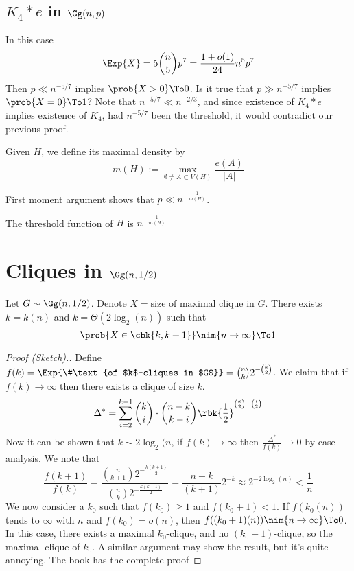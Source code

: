 \documentclass[a4paper, 11pt, oneside]{book}
\begin{document}
\subsection{$K_4*e$ in $\Gg(n,p)$}
In this case
\[
\Exp{X} = 5{n\choose 5}p^7 = \frac{1+o(1)}{24} n^5p^7
\]
Then $p\ll n^{-5/7}$ implies $\prob{X > 0}\To 0$. Is it true that $p\gg n^{-5/7}$ implies $\prob{X = 0}\To 1$? Note that $n^{-5/7} \ll n^{-2/3}$, and since existence of $K_4*e$ implies existence of $K_4$, had $n^{-5/7}$ been the threshold, it would contradict our previous proof.
\begin{yellowBox}
\begin{defn}
	 Given $H$, we define its maximal density by
	\[
	m(H) := \underset{\emptyset\neq A\subset V(H)}{\max} \frac{e(A)}{|A|}
	\]
\end{defn}	
\begin{remark}
	First moment argument shows that $p\ll n^{-\frac{1}{m(H)}}$.
\end{remark}
\end{yellowBox}
\begin{thm}
	\label{thm: Threshold characterization} The threshold function of $H$ is $n^{-\frac{1}{m(H)}}$
\end{thm}
\section{Cliques in $\Gg(n,1/2)$}
\begin{thm}
	Let $G\sim \Gg(n,1/2)$. Denote $X =\text{size of maximal clique in $G$}$.  There exists $k = k(n)$ and $k = \Theta(2\log_2(n))$ such that 
	\[
	\prob{X\in \cbk{k,k+1}} \nim{n\to \infty}\To 1
	\]
\end{thm}
\begin{proof}
	[Proof (Sketch).] Define 
	$f(k) = \Exp{\#\text{of $k$-cliques in $G$}} = {n\choose k}2^{-{k\choose 2}}$. We claim that if $f(k)\to \infty$ then there exists a clique of size $k$.
	\[
	\Delta^* =\sum_{i=2}^{k-1}{k\choose i}\cdot{n-k\choose k-i}\rbk{\frac{1}{2}}^{{k\choose 2}-{i\choose 2}}
	\]
	Now it can be shown that $k\sim 2\log_2(n$, if $f(k)\to \infty$ then $\frac{\Delta^*}{f(k)}\to 0$ by case analysis. We note that 
	\[
	\frac{f(k+1)}{f(k)} = \frac{{n\choose k+1}2^{-\frac{k(k+1)}{2}}}{{n\choose k}2^{-\frac{k(k-1)}{2}}} = \frac{n-k}{(k+1)}2^{-k}\approx 2^{-2\log_2(n)} < \frac{1}{n}
	\]
	We now consider a $k_0$ such that $f(k_0)\ge 1$ and $f(k_0+1) < 1$. If $f(k_0(n))$ tends to $\infty$ with $n$ and $f(k_0) = o(n)$, then $f((k_0+1)(n))\nim{n\to \infty}\To 0$. In this case, there exists a maximal $k_0$-clique, and no $(k_0+1)$-clique, so the maximal clique of $k_0$. A similar argument may show the result, but it's quite annoying. The book has the complete proof
\end{proof}
\end{document}
